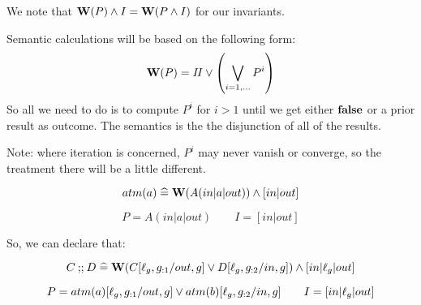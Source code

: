 We note that $\mathbf{W}(P) \land I = \mathbf{W}(P \land I)$ for our invariants.

\newpage
{}

Semantic calculations will be based on the following form:
\[
  \mathbf{W}(P) = \mathit{II} \lor \left(\bigvee_{i=1,\dots} P^i\right)
\]
So all we need to do is to compute $P^i$ for $i>1$
until we get either $\mathbf{false}$ or a prior result as outcome.
The semantics is the the disjunction of all of the results.

Note: where iteration is concerned, $P^i$ may never vanish
or converge, so the treatment there will be a little different.



\[ atm(a) \mathrel{\widehat=} \mathbf{W}(A(in|a|out)) \land [in|out] \]

\[ P = A(in|a|out) \qquad I = [in|out] \]


So, we can declare that:

\newpage
{}

\[
  C \mathbin{;\!;} D
   \mathrel{\widehat=}
   \mathbf{W}( C[\ell_g,g_{:1}/out,g] \lor
       D[\ell_g,g_{:2}/in,g] ) \land [in|\ell_g|out]
\]

\[ P =  atm(a)[\ell_g,g_{:1}/out,g] \lor
       atm(b)[\ell_g,g_{:2}/in,g]\qquad I = [in|\ell_g|out] \]


